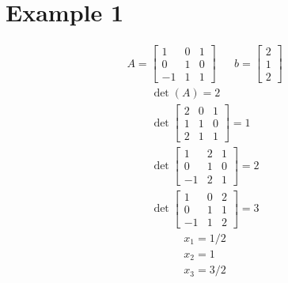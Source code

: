 \documentclass{article}
\theoremstyle{mytheoremstyle}
\theoremstyle{mytheoremstyle}
\theoremstyle{myproblemstyle}
\begin{document}
    \section*{Example 1}
    \begin{align*}
        A = \begin{bmatrix}
            1  & 0 & 1 \\
            0  & 1 & 0 \\
            -1 & 1 & 1
        \end{bmatrix} && b=\begin{bmatrix}
            2 \\
            1 \\
            2
        \end{bmatrix}
    \end{align*}
    \begin{align*}
        \det(A) = 2 \\
        \det \begin{bmatrix}
            2  & 0 & 1 \\
            1  & 1 & 0 \\
            2 & 1 & 1
        \end{bmatrix} = 1 \\
        \det \begin{bmatrix}
            1  & 2 & 1 \\
            0  & 1 & 0 \\
            -1 & 2 & 1
        \end{bmatrix} = 2 \\
        \det \begin{bmatrix}
            1  & 0 & 2 \\
            0  & 1 & 1 \\
            -1 & 1 & 2
        \end{bmatrix} = 3
    \end{align*}
    \begin{align*}
        x_1 = 1/2 \\
        x_2 = 1 \\
        x_3 = 3/2
    \end{align*}
\end{document}
